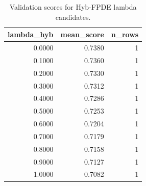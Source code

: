\begin{table}[t]
\caption{Validation scores for Hyb-FPDE lambda candidates.}
\label{tab:lambda_distribution_computed}
\centering
\begin{tabular}{rrr}
\toprule
lambda\_hyb & mean\_score & n\_rows \\
\midrule
0.0000 & 0.7380 & 1 \\
0.1000 & 0.7360 & 1 \\
0.2000 & 0.7330 & 1 \\
0.3000 & 0.7312 & 1 \\
0.4000 & 0.7286 & 1 \\
0.5000 & 0.7253 & 1 \\
0.6000 & 0.7204 & 1 \\
0.7000 & 0.7179 & 1 \\
0.8000 & 0.7158 & 1 \\
0.9000 & 0.7127 & 1 \\
1.0000 & 0.7082 & 1 \\
\bottomrule
\end{tabular}

\end{table}
